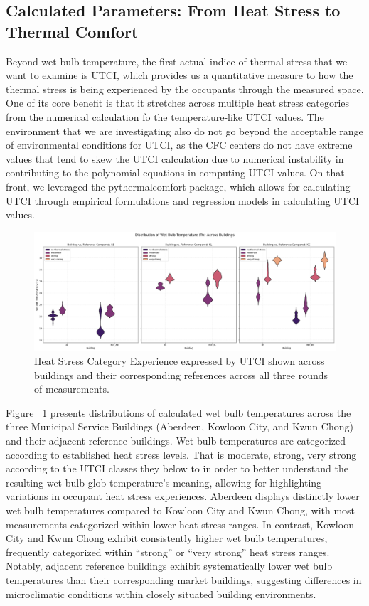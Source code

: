 \documentclass[preprint,12pt]{elsarticle}
\begin{document}
\subsection{Calculated Parameters: From Heat Stress to Thermal Comfort}

Beyond wet bulb temperature, the first actual indice of thermal stress that we want to examine is UTCI, which provides us a quantitative measure to how the thermal stress is being experienced by the occupants through the measured space\cite{35}. One of its core benefit is that it stretches across multiple heat stress categories from the numerical calculation fo the temperature-like UTCI values. The environment that we are investigating also do not go beyond the acceptable range of environmental conditions for UTCI, as the CFC centers do not have extreme values that tend to skew the UTCI calculation due to numerical instability in contributing to the polynomial equations in computing UTCI values. On that front, we leveraged the pythermalcomfort package\cite{36}, which allows for calculating UTCI through empirical formulations and regression models in calculating UTCI values.

\begin{figure}[h!]
    \centering
    \includegraphics[width=0.95\linewidth]{img/DIST_heatstress_Tw_subplots.png}
    \caption{Heat Stress Category Experience expressed by UTCI shown across buildings and their corresponding references across all three rounds of measurements.}
    \label{fig:heatstress-breakdown}
\end{figure}

Figure ~\ref{fig:heatstress-breakdown} presents distributions of calculated wet bulb temperatures across the three Municipal Service Buildings (Aberdeen, Kowloon City, and Kwun Chong) and their adjacent reference buildings. Wet bulb temperatures are categorized according to established heat stress levels. That is moderate, strong, very strong according to the UTCI classes they below to in order to better understand the resulting wet bulb glob temperature's meaning, allowing for highlighting variations in occupant heat stress experiences. Aberdeen displays distinctly lower wet bulb temperatures compared to Kowloon City and Kwun Chong, with most measurements categorized within lower heat stress ranges. In contrast, Kowloon City and Kwun Chong exhibit consistently higher wet bulb temperatures, frequently categorized within “strong” or “very strong” heat stress ranges. Notably, adjacent reference buildings exhibit systematically lower wet bulb temperatures than their corresponding market buildings, suggesting differences in microclimatic conditions within closely situated building environments. 
\end{document}
